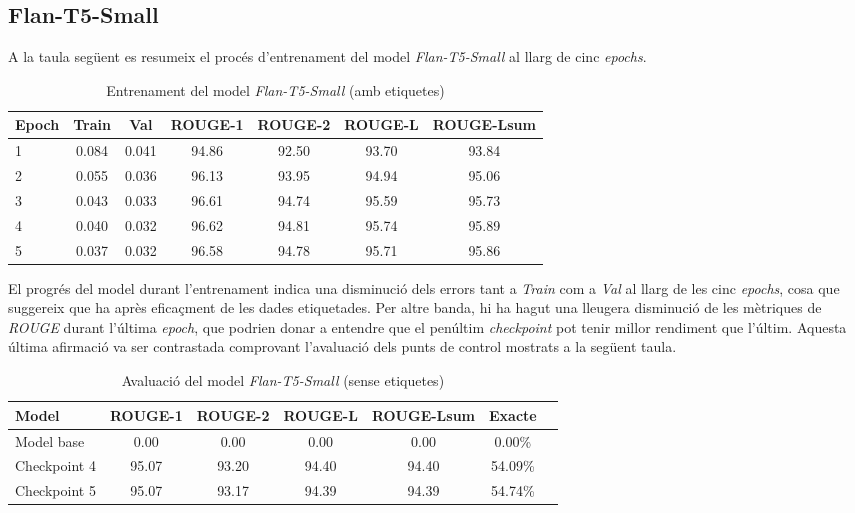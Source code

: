 \subsection{Flan-T5-Small}
A la taula següent es resumeix el procés d'entrenament del model \textit{Flan-T5-Small} al llarg de cinc \textit{epochs}.
\begin{table}[H]
    \centering
    \begin{tabular}{lcccccc}
    \toprule
    Epoch & Train & Val & ROUGE-1 & ROUGE-2 & ROUGE-L & ROUGE-Lsum \\
    \midrule
    1 & 0.084 & 0.041 & 94.86 & 92.50 & 93.70 & 93.84 \\
    2 & 0.055 & 0.036 & 96.13 & 93.95 & 94.94 & 95.06 \\
    3 & 0.043 & 0.033 & 96.61 & 94.74 & 95.59 & 95.73 \\
    4 & 0.040 & 0.032 & 96.62 & 94.81 & 95.74 & 95.89 \\
    5 & 0.037 & 0.032 & 96.58 & 94.78 & 95.71 & 95.86 \\
    \bottomrule
    \end{tabular}
    \caption[Entrenament del model \textit{Flan-T5-Small}]{Entrenament del model \textit{Flan-T5-Small} (amb etiquetes)}
\end{table}
El progrés del model durant l'entrenament indica una disminució dels errors tant a \textit{Train} com a \textit{Val} al llarg de les cinc \textit{epochs}, cosa que suggereix que ha après eficaçment de les dades etiquetades. Per altre banda, hi ha hagut una lleugera disminució de les mètriques de \textit{ROUGE} durant l'última \textit{epoch}, que podrien donar a entendre que el penúltim \textit{checkpoint} pot tenir millor rendiment que l'últim. Aquesta última afirmació va ser contrastada comprovant l'avaluació dels punts de control mostrats a la següent taula. 

\begin{table}[H]
    \centering
    \begin{tabular}{lcccccc}
    \toprule
    Model & ROUGE-1 & ROUGE-2 & ROUGE-L & ROUGE-Lsum & Exacte \\
    \midrule
    Model base   & 0.00  & 0.00  & 0.00  & 0.00  & 0.00\% \\
    Checkpoint 4 & 95.07 & 93.20 & 94.40 & 94.40 & 54.09\% \\
    Checkpoint 5 & 95.07 & 93.17 & 94.39 & 94.39 & 54.74\% \\
    \bottomrule
    \end{tabular}
    \caption[Avaluació del model \textit{Flan-T5-Small}]{Avaluació del model \textit{Flan-T5-Small} (sense etiquetes)}
\end{table}

